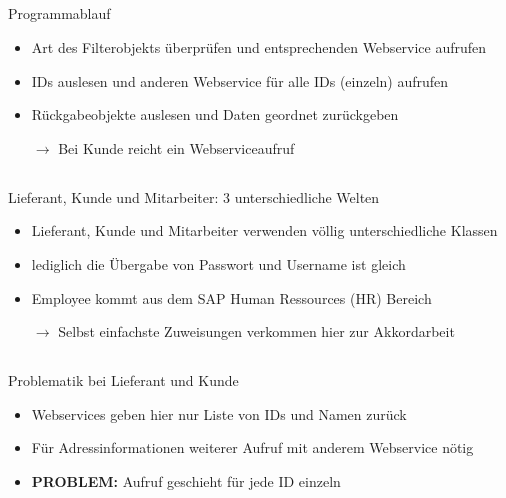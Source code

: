 \documentclass[xcolor={usenames,dvipsnames}, compress, 10pt]{beamer}
\begin{document}
\subsection*{}

\begin{frame}{Programmablauf}
\begin{center}

\begin{itemize}
\item Art des Filterobjekts überprüfen und entsprechenden Webservice aufrufen
\item IDs auslesen und anderen Webservice für alle IDs (einzeln) aufrufen
\item Rückgabeobjekte auslesen und Daten geordnet zurückgeben
\item[$\rightarrow$]Bei Kunde reicht ein Webserviceaufruf
\end{itemize}

\end{center}
\end{frame}

\subsection*{}

\begin{frame}{Lieferant, Kunde und Mitarbeiter: 3 unterschiedliche Welten}
\begin{center}

\begin{itemize}
\item Lieferant, Kunde und Mitarbeiter verwenden völlig unterschiedliche Klassen
\item lediglich die Übergabe von Passwort und Username ist gleich
\item Employee kommt aus dem SAP Human Ressources (HR) Bereich
\item [$\rightarrow$]Selbst einfachste Zuweisungen verkommen hier zur Akkordarbeit
\end{itemize}

\end{center}
\end{frame}

\subsection*{}

\begin{frame}{Problematik bei Lieferant und Kunde}
\begin{center}

\begin{itemize}
\item Webservices geben hier nur Liste von IDs und Namen zurück
\item Für Adressinformationen weiterer Aufruf mit anderem Webservice nötig
\item \textbf{PROBLEM: } Aufruf geschieht für jede ID einzeln
\end{itemize}

\end{center}
\end{frame}
\end{document}
